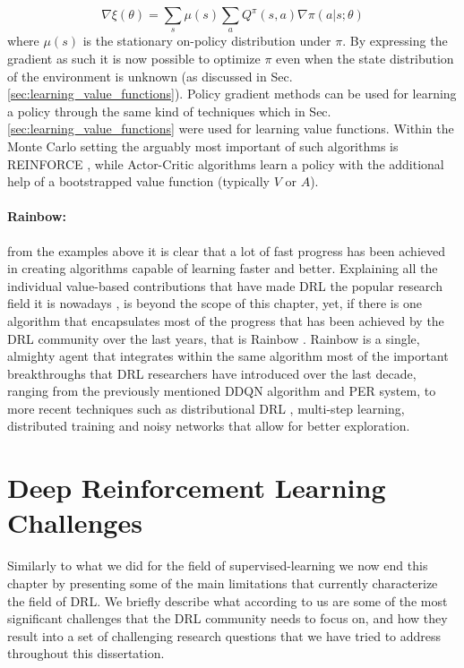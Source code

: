 \begin{equation}
	\nabla \xi(\theta) = \sum_{s} \mu(s) \sum_{a} Q^{\pi}(s,a) \nabla \pi(a|s;\theta)
\end{equation}
where $\mu(s)$ is the stationary on-policy distribution under $\pi$. By expressing the gradient as such it is now possible to optimize $\pi$ even when the state distribution of the environment is unknown (as discussed in Sec. \ref{sec:learning_value_functions}). Policy gradient methods can be used for learning a policy through the same kind of techniques which in Sec. \ref{sec:learning_value_functions} were used for learning value functions. Within the Monte Carlo setting the arguably most important of such algorithms is REINFORCE \cite{williams1992simple}, while Actor-Critic algorithms \cite{lillicrap2015continuous,schulman2015high,schulman2015trust,wang2016sample,mnih2016asynchronous,schulman2017proximal,haarnoja2018soft,fujimoto2018addressing} learn a policy with the additional help of a bootstrapped value function (typically $V$ or $A$).


\paragraph{Rainbow:} from the examples above it is clear that a lot of fast progress has been achieved in creating algorithms capable of learning faster and better. Explaining all the individual value-based contributions that have made DRL the popular research field it is nowadays \cite{henderson2018deep}, is beyond the scope of this chapter, yet, if there is one algorithm that encapsulates most of the progress that has been achieved by the DRL community over the last years, that is Rainbow \cite{hessel2018rainbow}. Rainbow is a single, almighty agent that integrates within the same algorithm most of the important breakthroughs that DRL researchers have introduced over the last decade, ranging from the previously mentioned DDQN algorithm and PER system, to more recent techniques such as distributional DRL \cite{bellemare2017distributional}, multi-step learning, distributed training \cite{mnih2016asynchronous} and noisy networks \cite{fortunato2017noisy} that allow for better exploration.


\section{Deep Reinforcement Learning Challenges}
\label{sec:challenges}
Similarly to what we did for the field of supervised-learning we now end this chapter by presenting some of the main limitations that currently characterize the field of DRL. We briefly describe what according to us are some of the most significant challenges that the DRL community needs to focus on, and how they result into a set of challenging research questions that we have tried to address throughout this dissertation.

